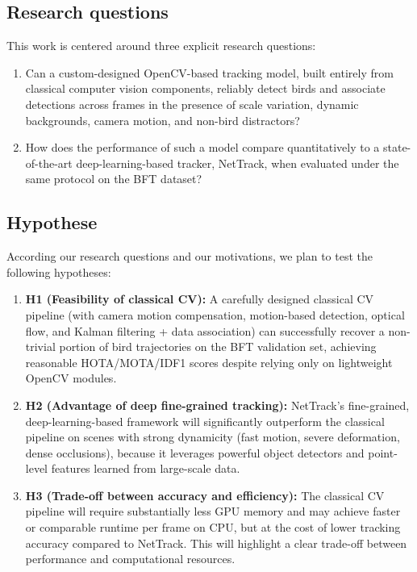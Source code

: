 \subsection{Research questions}
\label{sec:research_questions}

This work is centered around three explicit research questions:

\begin{enumerate}
    \item Can a custom-designed OpenCV-based tracking model, built entirely from classical computer vision components, reliably detect birds and associate detections across frames in the presence of scale variation, dynamic backgrounds, camera motion, and non-bird distractors?
    \item How does the performance of such a model compare quantitatively to a state-of-the-art deep-learning-based tracker, NetTrack, when evaluated under the same protocol on the BFT dataset?
\end{enumerate}

\subsection{Hypothese}
\label{sec:hypothese}

According our research questions and our motivations, we plan to test the following hypotheses:

\begin{enumerate}
    \item \textbf{H1 (Feasibility of classical CV):} A carefully designed classical CV pipeline (with camera motion compensation, motion-based detection, optical flow, and Kalman filtering + data association) can successfully recover a non-trivial portion of bird trajectories on the BFT validation set, achieving reasonable HOTA/MOTA/IDF1 scores despite relying only on lightweight OpenCV modules.
    \item \textbf{H2 (Advantage of deep fine-grained tracking):} NetTrack’s fine-grained, deep-learning-based framework will significantly outperform the classical pipeline on scenes with strong dynamicity (fast motion, severe deformation, dense occlusions), because it leverages powerful object detectors and point-level features learned from large-scale data.
    \item \textbf{H3 (Trade-off between accuracy and efficiency):} The classical CV pipeline will require substantially less GPU memory and may achieve faster or comparable runtime per frame on CPU, but at the cost of lower tracking accuracy compared to NetTrack. This will highlight a clear trade-off between performance and computational resources.
\end{enumerate}

